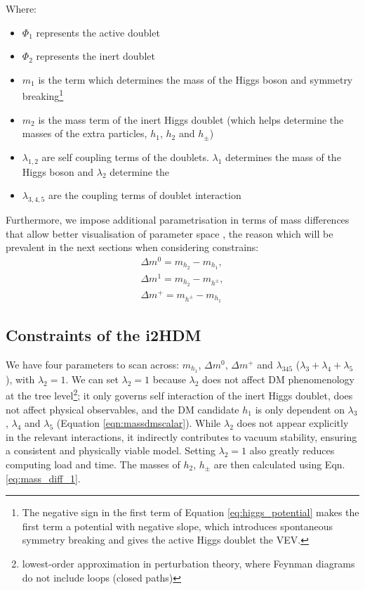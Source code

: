 \documentclass[12pt]{article}
\begin{document}
Where:
\begin{itemize}
    \item $\Phi_1$ represents the active doublet
    \item $\Phi_2$ represents the inert doublet
    \item $m_1$ is the term which determines the mass of the Higgs boson and symmetry breaking\footnote{The negative sign in the first term of Equation \ref{eq:higgs_potential} makes the first term a potential with negative slope, which introduces spontaneous symmetry breaking and gives the active Higgs doublet the VEV.}
    \item $m_2$ is the mass term of the inert Higgs doublet (which helps determine the masses of the extra particles, $h_1$, $h_2$ and $h_\pm$)
    \item $\lambda_{1, 2}$ are self coupling terms of the doublets. $\lambda_1$ determines the mass of the Higgs boson and $\lambda_2$ determine the 
    \item $\lambda_{3, 4, 5}$ are the coupling terms of doublet interaction
\end{itemize}
Furthermore, we impose additional parametrisation in terms of mass differences that allow better visualisation of parameter space \cite{Belyaev_2022}, the reason which will be prevalent in the next sections when considering constrains:
\begin{align}
\label{eq:mass_diff_1}
    \Delta m^0 = m_{h_2} - m_{h_1},\\
    \Delta m^1 = m_{h_2} - m_{h^\pm},\\
    \Delta m^+ = m_{h^\pm} - m_{h_1}
\end{align}

\subsection{Constraints of the i2HDM}
We have four parameters to scan across: $m_{h_1}$, $\Delta m^0$, $\Delta m^+$ and $\lambda_{345}$ ($\lambda_3 + \lambda_4 + \lambda_5$), with $\lambda_2 = 1$. We can set $\lambda_2 = 1$ because $\lambda_2$ does not affect DM phenomenology at the tree level\footnote{lowest-order approximation in perturbation theory, where Feynman diagrams do not include loops (closed paths)}\cite{Belyaev:2016lok}; it only governs self interaction of the inert Higgs doublet, does not affect physical observables, and the DM candidate $h_1$ is only dependent on $\lambda_3$, $\lambda_4$ and $\lambda_5$ (Equation \ref{eqn:massdmscalar}). While $\lambda_2$ does not appear explicitly in the relevant interactions, it indirectly contributes to vacuum stability, ensuring a consistent and physically viable model. Setting $\lambda_2 = 1$ also greatly reduces computing load and time. The masses of $h_2$, $h_\pm$ are then calculated using Eqn. \ref{eq:mass_diff_1}.
\end{document}
